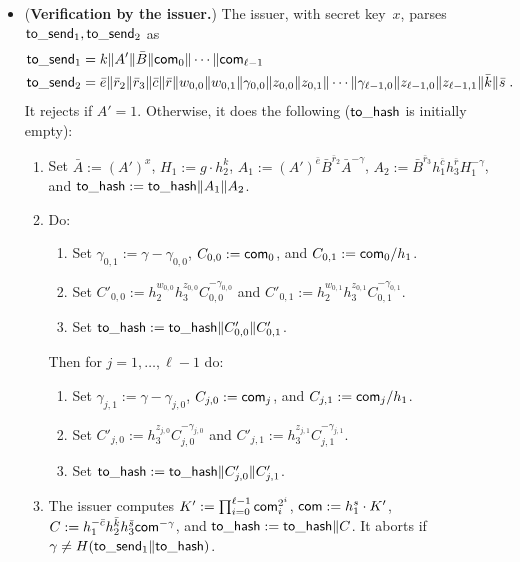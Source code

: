 \documentclass[11pt]{article}
\def\com{{\sf com}}
\def\send{{\sf to}\mbox{\_}{\sf send}}
\def\hash{{\sf to}\mbox{\_}{\sf hash}}
\begin{document}
\begin{itemize}
\begin{enumerate}
    \end{enumerate}
            \item ({\bf Verification by the issuer.}) The issuer, with secret key~$x$, parses $\send_1, \send_2$ as
            \begin{eqnarray*} & \send_1 = k\|A'\|\bar B\|\com_0\|\cdots\|\com_{\ell-1} & \\
            &\send_2 = \bar e \| \bar r_2\|\bar r_3\|\bar c \| \bar r\| w_{0,0}\|w_{0,1}\| \gamma_{0,0}\|z_{0,0}\|z_{0,1}\|\cdots \| \gamma_{\ell-1,0}\|z_{\ell-1,0}\|z_{\ell-1,1}\|\bar k\|\bar s \; .&
            \end{eqnarray*}
It rejects if $A'=1$. Otherwise, it does the following ($\hash$ is initially empty):
\begin{enumerate}
    \item Set $\bar A:=(A')^x$, $H_1:=g \cdot h_2^k$, $A_1:= (A')^{\bar e} \bar B^{\bar r_2} \bar A^{-\gamma}$, $A_2:= \bar B^{\bar r_3} h_1^{\bar c} h_3^{\bar r} H_1^{-\gamma}$, and $\hash:=\hash\|A_1\|A_2$. 
    \item Do:
           \begin{enumerate}
           \item Set $\gamma_{0,1}:=\gamma-\gamma_{0,0}$, $C_{0,0}:=\com_0$, and  $C_{0,1}:=\com_0/h_1$.
           \item Set $C'_{0,0}:=h_2^{w_{0,0}} h_3^{z_{0,0}} C_{0,0}^{-\gamma_{0,0}}$ and $C'_{0,1}:=h_2^{w_{0,1}} h_3^{z_{0,1}}C_{0,1}^{-\gamma_{0,1}}$.
           \item Set $\hash:=\hash\|C'_{0,0}\|C'_{0,1}$.
       \end{enumerate}
       Then for $j=1, \ldots, \ell-1$ do:
              \begin{enumerate}
           \item Set $\gamma_{j,1}:=\gamma-\gamma_{j,0}$, $C_{j,0}:=\com_j$, and  $C_{j,1}:=\com_j/h_1$.
           \item Set $C'_{j,0}:=h_3^{z_{j,0}} C_{j,0}^{-\gamma_{j,0}}$ and $C'_{j,1}:=h_3^{z_{j,1}}C_{j,1}^{-\gamma_{j,1}}$.
           \item Set $\hash:=\hash\|C'_{j,0}\|C'_{j,1}$.
       \end{enumerate}
       \item The issuer computes $K':=\prod_{i=0}^{\ell-1} \com_i^{2^i}$, $\com:=h_1^s\cdot K'$, $C:=h_1^{-\bar c} h_2^{\bar k} h_3^{\bar s} \com^{-\gamma}$, and $\hash:=\hash\|C$. It aborts if $\gamma \neq H(\send_1\|\hash)$.
\end{enumerate}


\end{itemize}
\end{document}
